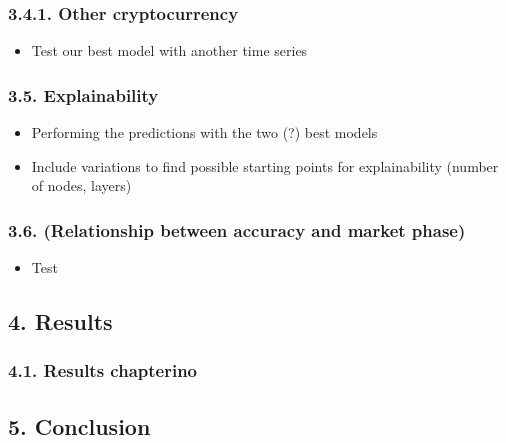 \documentclass[
]{article}
\providecommand{\tightlist}{%
  \setlength{\itemsep}{0pt}\setlength{\parskip}{0pt}}
\begin{document}
\hypertarget{other-cryptocurrency}{%
\subsubsection{3.4.1. Other cryptocurrency}\label{other-cryptocurrency}}

\begin{itemize}
\tightlist
\item
  Test our best model with another time series
\end{itemize}

\hypertarget{explainability}{%
\subsubsection{3.5. Explainability}\label{explainability}}

\begin{itemize}
\item
  Performing the predictions with the two (?) best models
\item
  Include variations to find possible starting points for explainability
  (number of nodes, layers)
\end{itemize}

\hypertarget{relationship-between-accuracy-and-market-phase}{%
\subsubsection{3.6. (Relationship between accuracy and market
phase)}\label{relationship-between-accuracy-and-market-phase}}

\begin{itemize}
\tightlist
\item
  Test
\end{itemize}

\newpage

\hypertarget{results}{%
\subsection{4. Results}\label{results}}

\hypertarget{results-chapterino}{%
\subsubsection{4.1. Results chapterino}\label{results-chapterino}}

\newpage

\hypertarget{conclusion}{%
\subsection{5. Conclusion}\label{conclusion}}
\end{document}

